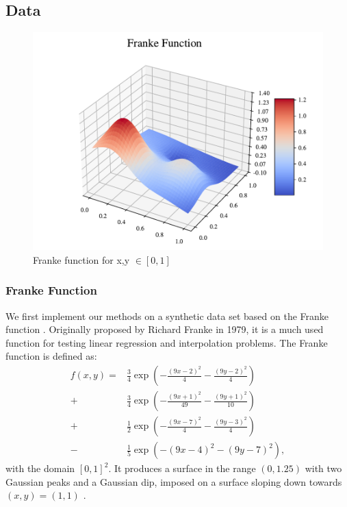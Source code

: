 \subsection{Data}

\begin{figure}[h!]
\centering
\includegraphics[width=1\linewidth]{project_1/figures/figures_in_report/franke_func.pdf}
\caption{Franke function for x,y $\in [0,1]$}
\label{franke}
\end{figure}

\subsubsection{Franke Function}
We first implement our methods on a synthetic data set based on the Franke function \citep[p. 13]{frank}. Originally proposed by Richard Franke in 1979, it is a much used function for testing linear regression and interpolation problems.
The Franke function is defined as:
\begin{align}\label{eq:franke}
    f(x, y) = &\frac{3}{4} \exp\left( -\frac{(9x - 2)^2}{4} - \frac{(9y - 2)^2}{4} \right) \nonumber \\
    + &\frac{3}{4} \exp\left( -\frac{(9x + 1)^2}{49} - \frac{(9y + 1)^2}{10} \right) \nonumber \\
    + &\frac{1}{2} \exp\left( -\frac{(9x - 7)^2}{4} - \frac{(9y - 3)^2}{4} \right) \nonumber \\
    - &\frac{1}{5} \exp\left( -(9x - 4)^2 - (9y - 7)^2 \right),
\end{align}
with the domain $[0, 1]^2$. It produces a surface in the range $(0, 1.25)$ with two Gaussian peaks and a Gaussian dip, imposed on a surface sloping down towards $(x,y)=(1, 1)$ \citep[p. 13]{frank}.

